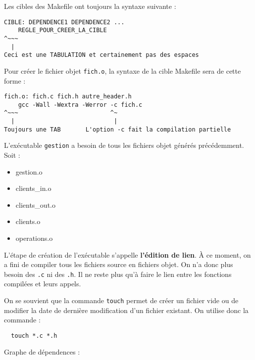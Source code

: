 \documentclass[10pt]{article}
\begin{document}
\begin{enumerate}[label=\textbf{[\alph*]}]
\item Les cibles des Makefile ont toujours la syntaxe suivante :

\begin{verbatim}
CIBLE: DEPENDENCE1 DEPENDENCE2 ...
    REGLE_POUR_CREER_LA_CIBLE
^~~~
  |
Ceci est une TABULATION et certainement pas des espaces
\end{verbatim}

  Pour créer le fichier objet \texttt{fich.o}, la syntaxe de la cible
  Makefile sera de cette forme :

\begin{verbatim}
fich.o: fich.c fich.h autre_header.h
    gcc -Wall -Wextra -Werror -c fich.c
^~~~                          ^~
  |                            |
Toujours une TAB       L'option -c fait la compilation partielle
\end{verbatim}

\item L'exécutable \texttt{gestion} a besoin de tous les fichiers
  objet générés précédemment. Soit :

  \begin{itemize}
  \item gestion.o
  \item clients\_in.o
  \item clients\_out.o
  \item clients.o
  \item operations.o
  \end{itemize}

  L'étape de création de l'exécutable s'appelle
  \textbf{l'édition de lien}. À ce moment, on a fini de compiler tous
  les fichiers source en fichiers objet. On n'a donc plus besoin des
  \texttt{.c} ni des \texttt{.h}. Il ne reste plus qu'à faire le lien
  entre les fonctions compilées et leurs appels.

\item On se souvient que la commande \texttt{touch} permet de créer un
  fichier vide ou de modifier la date de dernière modification d'un
  fichier existant. On utilise donc la commande :

\begin{verbatim}
  touch *.c *.h
\end{verbatim}

\item Graphe de dépendences :


\end{enumerate}
\end{document}
